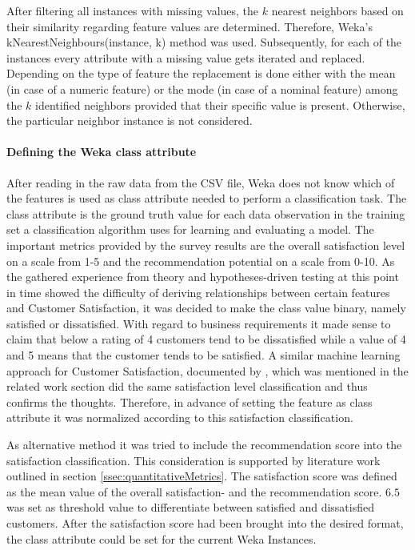 After filtering all instances with missing values, the $k$ nearest neighbors based on their similarity regarding feature values are determined. Therefore, Weka's kNearestNeighbours(instance, k) method was used. Subsequently, for each of the instances every attribute with a missing value gets iterated and replaced. Depending on the type of feature the replacement is done either with the mean (in case of a numeric feature) or the mode (in case of a nominal feature) among the $k$ identified neighbors provided that their specific value is present. Otherwise, the particular neighbor instance is not considered.

\paragraph{Defining the Weka class attribute}
After reading in the raw data from the CSV file, Weka does not know which of the features is used as class attribute needed to perform a classification task. The class attribute is the ground truth value for each data observation in the training set a classification algorithm uses for learning and evaluating a model. The important metrics provided by the survey results are the overall satisfaction level on a scale from 1-5 and the recommendation potential on a scale from 0-10. As the gathered experience from theory and hypotheses-driven testing at this point in time showed the difficulty of deriving relationships between certain features and Customer Satisfaction, it was decided to make the class value binary, namely satisfied or dissatisfied. With regard to business requirements it made sense to claim that below a rating of 4 customers tend to be dissatisfied while a value of 4 and 5 means that the customer tends to be satisfied. A similar machine learning approach for Customer Satisfaction, documented by \cite{meinzer2016can}, which was mentioned in the related work section did the same satisfaction level classification and thus confirms the thoughts. Therefore, in advance of setting the feature as class attribute it was normalized according to this satisfaction classification. 

As alternative method it was tried to include the recommendation score into the satisfaction classification. This consideration is supported by literature work outlined in section \ref{ssec:quantitativeMetrics}. The satisfaction score was defined as the mean value of the overall satisfaction- and the recommendation score. $6.5$ was set as threshold value to differentiate between satisfied and dissatisfied customers. After the satisfaction score had been brought into the desired format, the class attribute could be set for the current Weka Instances.

